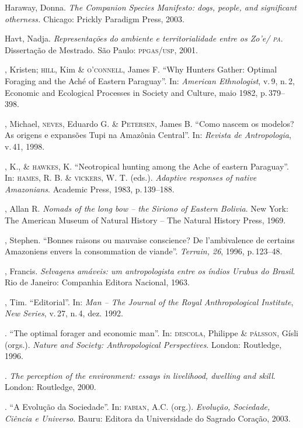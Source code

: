 \begin{bibliohedra}
Haraway, Donna. \emph{The Companion Species Manifesto: dogs, people, and
significant otherness.} Chicago: Prickly Paradigm Press, 2003.

Havt, Nadja. \emph{Representações do ambiente e territorialidade entre
os Zo'e/ \textsc{pa}}. Dissertação de Mestrado. São Paulo: \textsc{ppgas}/\textsc{usp}, 2001.

, Kristen; \textsc{hill}, Kim \& \textsc{o'connell}, James F.
``Why Hunters Gather: Optimal Foraging and the Aché of
Eastern Paraguay''. In: \emph{American Ethnologist}, v.\,9, n.\,2, Economic and Ecological Processes in Society and Culture, maio 1982, p.\,379--398.

, Michael, \textsc{neves}, Eduardo G. \& \textsc{Petersen}, James B.
``Como nascem os modelos? As origens e expansões Tupi na Amazônia Central''. In: \emph{Revista de Antropologia}, v.\,41, 1998.

, K., \& \textsc{hawkes}, K. ``Neotropical hunting among the Ache of eastern
Paraguay''. In: \textsc{hames}, R. B. \& \textsc{vickers}, W. T. (eds.). \emph{Adaptive
responses of native Amazonians}. Academic Press, 1983, p.\,139--188.

, Allan R. \emph{Nomads of the long bow -- the Siriono of Eastern
Bolivia}. New York: The American Museum of Natural History -- The
Natural History Press, 1969.

, Stephen. ``Bonnes raisons ou mauvaise conscience? De l'ambivalence
de certains Amazoniens envers la consommation de viande''. \emph{Terrain,
26}, 1996, p.\,123--48.

, Francis. \emph{Selvagens amáveis: um antropologista entre os índios
Urubus do Brasil}. Rio de Janeiro: Companhia Editora Nacional, 1963.

, Tim. ``Editorial''. In: \emph{Man -- The Journal of the
Royal Anthropological Institute}, \emph{New Series}, v.\,27, n.\,4, dez. 1992.

\titidem. ``The optimal forager and economic man''. In: \textsc{descola}, Philippe \& \textsc{pálsson}, Gísli (orgs.). \emph{Nature and Society: Anthropological Perspectives}. London: Routledge, 1996.

\titidem. \emph{The perception of the environment: essays in
livelihood, dwelling and skill}. London: Routledge, 2000.

\titidem. ``A Evolução da Sociedade''. In: \textsc{fabian}, A.C. (org.).
\emph{Evolução, Sociedade, Ciência e Universo}. Bauru: Editora da
Universidade do Sagrado Coração, 2003.


\end{bibliohedra}

